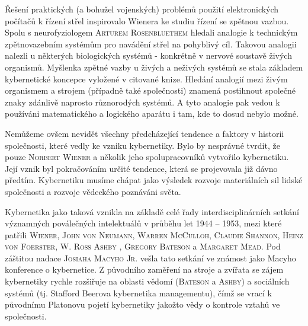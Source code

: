     
    Řešení praktických (a bohužel vojenských) problémů použití elektronických počítačů k řízení
    střel inspirovalo Wienera ke studiu řízení se zpětnou vazbou. Spolu s neurofyziologem
    \textsc{Arturem Rosenbluethem} hledali analogie k technickým zpětnovazebním systémům pro
    navádění střel na pohyblivý cíl. Takovou analogii nalezli u některých biologických systémů -
    konkrétně v nervové soustavě živých organismů. Myšlenka zpětné vazby u živých a neživých systémů
    se stala základem kybernetické koncepce vyložené v citované knize. Hledání analogií mezi živým
    organismem a strojem (případně také společnosti) znamená postihnout společné znaky zdánlivě
    naprosto různorodých systémů. A tyto analogie pak vedou k používáni matematického a logického
    aparátu i tam, kde to dosud nebylo možné.
    
    Nemůžeme ovšem nevidět všechny předcházející tendence a faktory v historii společnosti, které
    vedly ke vzniku kybernetiky. Bylo by nesprávné tvrdit, že pouze \textsc{Norbert Wiener} a
    několik jeho spolupracovníků vytvořilo kybernetiku. Její vznik byl pokračováním určité tendence,
    která se projevovala již dávno předtím. Kybernetiku musíme chápat jako výsledek rozvoje
    materiálních sil lidské společnosti a rozvoje vědeckého poznáváni světa.
    
    Kybernetika jako taková vznikla na základě celé řady interdisciplinárních setkání významných
    poválečných intelektuálů v průběhu let 1944 – 1953, mezi které patřili \textsc{Wiener},
    \textsc{John von Neumann}, \textsc{Warren McCulloh}, \textsc{Claudie Shannon}, \textsc{Heinz von
    Foerster}, \textsc{W. Ross Ashby} \cite{Ashby1956}, \textsc{Gregory Bateson} a \textsc{Margaret
    Mead}. Pod záštitou nadace \textsc{Josiaha Macyho Jr.} vešla tato setkání ve známost jako Macyho
    konference o kybernetice. Z původního zaměření na stroje a zvířata se zájem kybernetiky rychle
    rozšiřuje na oblasti vědomí (\textsc{Bateson} a \textsc{Ashby}) a sociálních systémů (tj.
    Stafford Beerova kybernetika managementu), čímž se vrací k původnímu Platonovu pojetí
    kybernetiky jakožto vědy o kontrole vztahů ve společnosti. 
    
